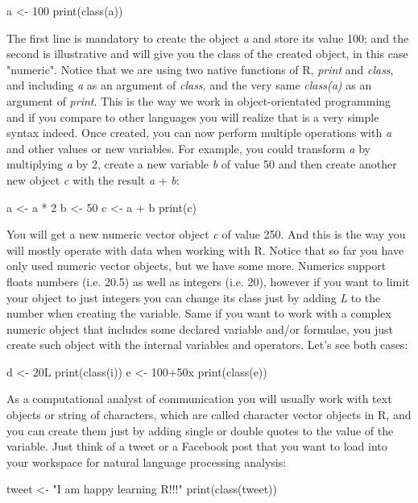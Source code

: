 \begin{exampler}
a <- 100
print(class(a))
\end{exampler}

The first line is mandatory to create the object \emph{a} and store its value 100; and the second is illustrative and will give you the class of the created object, in this case "numeric". Notice that we are using two native functions of R, \emph{print} and \emph{class}, and including \emph{a} as an argument of \emph{class}, and the very same \emph{class(a)} as an argument of \emph{print}. This is the way we work in object-orientated programming and if you compare to other languages you will realize that is a very simple syntax indeed. Once created, you can now perform multiple operations with \emph{a} and other values or new variables. For example, you could transform \emph{a} by multiplying \emph{a} by 2, create a new variable \emph{b} of value 50 and then create another new object \emph{c} with the result \emph{a} + \emph{b}:

\begin{exampler}
a <- a * 2
b <- 50
c <- a + b
print(c)
\end{exampler}

You will get a new numeric vector object \emph{c} of value 250. And this is the way you will mostly operate with data when working with R. Notice that so far you have only used numeric vector objects, but we have some more. Numerics support floats numbers (i.e. 20.5) as well as integers (i.e. 20), however if you want to limit your object to just integers you can change its class just by adding \emph{L} to the number when creating the variable. Same if you want to work with a complex numeric object that includes some declared variable and/or formulae, you just create such object with the internal variables and operators. Let’s see both cases:

\begin{exampler}
d <- 20L
print(class(i))
e <- 100+50x
print(class(e))
\end{exampler}

As a computational analyst of communication you will usually work with text objects or string of characters, which are called character vector objects in R, and you can create them just by adding single or double quotes to the value of the variable. Just think of a tweet or a Facebook post that you want to load into your workspace for natural language processing analysis:

\begin{exampler}
tweet <- "I am happy learning R!!!"
print(class(tweet))
\end{exampler}

